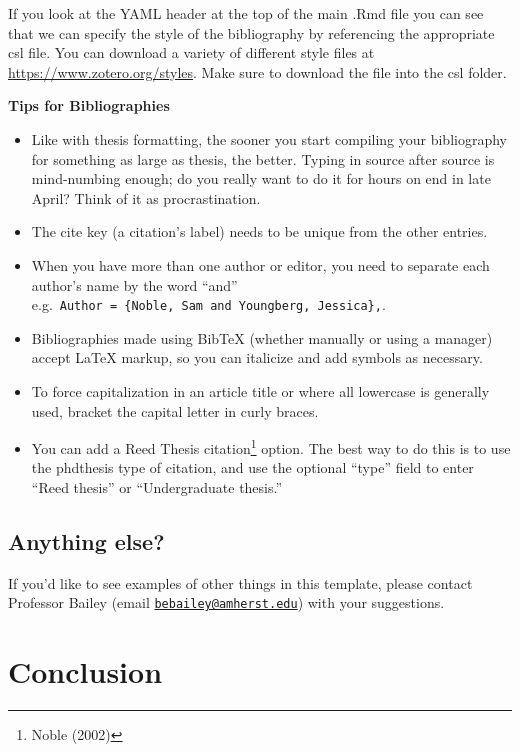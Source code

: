 \documentclass[12pt, twoside]{amherstthesis}
\providecommand{\tightlist}{%
  \setlength{\itemsep}{0pt}\setlength{\parskip}{0pt}}
\begin{document}
If you look at the YAML header at the top of the main .Rmd file you can see that we can specify the style of the bibliography by referencing the appropriate csl file. You can download a variety of different style files at \url{https://www.zotero.org/styles}. Make sure to download the file into the csl folder.

\textbf{Tips for Bibliographies}
\begin{itemize}
\tightlist
\item
  Like with thesis formatting, the sooner you start compiling your bibliography for something as large as thesis, the better. Typing in source after source is mind-numbing enough; do you really want to do it for hours on end in late April? Think of it as procrastination.
\item
  The cite key (a citation's label) needs to be unique from the other entries.
\item
  When you have more than one author or editor, you need to separate each author's name by the word ``and'' e.g.~\texttt{Author\ =\ \{Noble,\ Sam\ and\ Youngberg,\ Jessica\},}.
\item
  Bibliographies made using BibTeX (whether manually or using a manager) accept LaTeX markup, so you can italicize and add symbols as necessary.
\item
  To force capitalization in an article title or where all lowercase is generally used, bracket the capital letter in curly braces.
\item
  You can add a Reed Thesis citation\footnote{Noble (2002)} option. The best way to do this is to use the phdthesis type of citation, and use the optional ``type'' field to enter ``Reed thesis'' or ``Undergraduate thesis.''
\end{itemize}
\hypertarget{anything-else}{%
\section{Anything else?}\label{anything-else}}

If you'd like to see examples of other things in this template, please contact Professor Bailey (email \href{mailto:bebailey@amherst.edu}{\nolinkurl{bebailey@amherst.edu}}) with your suggestions.

\hypertarget{conclusion-1}{%
\chapter*{Conclusion}\label{conclusion-1}}
\end{document}

